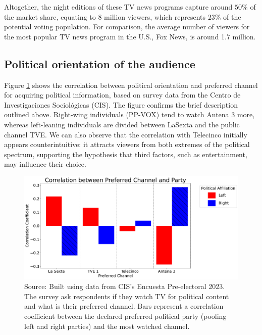 \documentclass[12pt]{article}
\begin{document}
Altogether, the night editions of these TV news programs capture around $50\%$ of the market share, equating to 8 million viewers, which represents $23\%$ of the potential voting population. For comparison, the average number of viewers for the most popular TV news program in the U.S., Fox News, is around 1.7 million.







\subsection{Political orientation of the audience }


Figure \ref{opinion} shows the correlation between political orientation and preferred channel for acquiring political information, based on survey data from the Centro de Investigaciones Sociológicas (CIS). The figure confirms the brief description outlined above. Right-wing individuals (PP-VOX) tend to watch Antena 3 more, whereas left-leaning individuals are divided between LaSexta and the public channel TVE. We can also observe that the correlation with Telecinco initially appears counterintuitive: it attracts viewers from both extremes of the political spectrum, supporting the hypothesis that third factors, such as entertainment, may influence their choice.

\begin{figure}[h!]
	\centering
	\includegraphics[width=160mm]{figures/corr_party_channel3}
	\caption{Source: Built using data from CIS's Encuesta Pre-electoral 2023. The survey ask respondents if they watch TV for political content and what is their preferred channel. Bars represent a correlation coefficient between the declared preferred political party (pooling left and right parties) and the most watched channel. }
	\label{opinion}
\end{figure}
\end{document}
